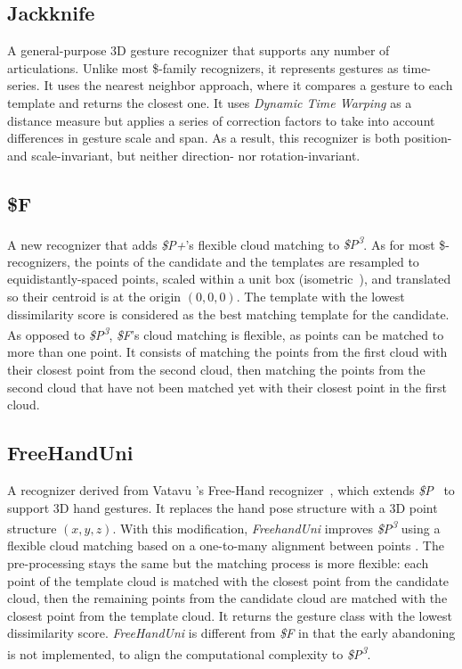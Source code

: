 \subsection{Jackknife}
A general-purpose 3D gesture recognizer \cite{Taranta:2017} that supports any number of articulations. Unlike most \$-family recognizers, it represents gestures as time-series. It uses the nearest neighbor approach, where it compares a gesture to each template and returns the closest one. It uses \textit{Dynamic Time Warping} as a distance measure but applies a series of correction factors to take into account differences in gesture scale and span. As a result, this recognizer is both position- and scale-invariant, but neither direction- nor rotation-invariant.

\subsection{\$F}    
A new recognizer that adds \textit{\$P+}'s flexible cloud matching \cite{Vatavu:2017a} to \textit{\$P\textsuperscript{3}}. As for most \$-recognizers, the points of the candidate and the templates are resampled to equidistantly-spaced points, scaled within a unit box (isometric~\cite{Vanderdonckt:2018}), and translated so their centroid is at the origin $(0,0,0)$. The template with the lowest dissimilarity score is considered as the best matching template for the candidate. As opposed to \textit{\$P\textsuperscript{3}}, \textit{\$F}'s cloud matching is flexible, as points can be matched to more than one point. It consists of matching the points from the first cloud with their closest point from the second cloud, then matching the points from the second cloud that have not been matched yet with their closest point in the first cloud. 
    
\subsection{FreeHandUni}
A recognizer derived from Vatavu \etal's Free-Hand recognizer~\cite{Vatavu:2016}, which extends \textit{\$P}~\cite{Vatavu:2012} to support 3D hand gestures. It replaces the hand pose structure with a 3D point structure $(x,y,z)$. With this modification, \textit{FreehandUni} improves \textit{\$P\textsuperscript{3}} using a flexible cloud matching based on a one-to-many alignment between points \cite{Vatavu:2017a}. The pre-processing stays the same but the matching process is more flexible: each point of the template cloud is matched with the closest point from the candidate cloud, then the remaining points from the candidate cloud are matched with the closest point from the template cloud. It returns the gesture class with the lowest dissimilarity score. \textit{FreeHandUni} is different from \textit{\$F} in that the early abandoning is not implemented, to align the computational complexity to \textit{\$P\textsuperscript{3}}.
    
